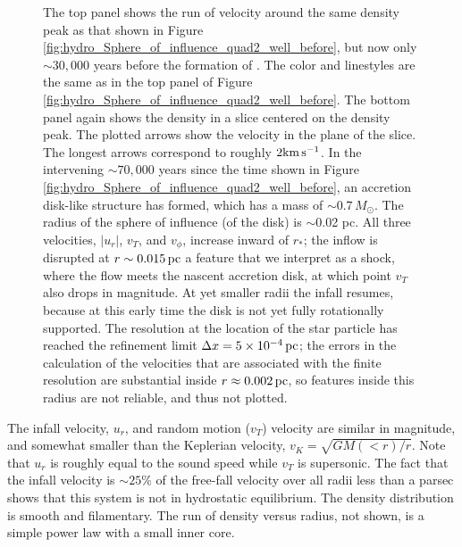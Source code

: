 \documentclass[../dissertation.tex]{subfiles}
\begin{document}
%
\begin{figure}[htb] %
\caption[Hydro Sphere of Influence 2]{\label{fig:hydro_Sphere_influence_quad2_prior_to_particle}The top panel shows the run of velocity around the same density peak 
as that shown in Figure \ref{fig:hydro_Sphere_of_influence_quad2_well_before}, 
but now only $\sim 30,000$ years before the formation of \partA .
The color and linestyles are the same as in the top panel of Figure \ref{fig:hydro_Sphere_of_influence_quad2_well_before}.
The bottom panel again shows the density in a slice centered on the density peak.
The plotted arrows show the velocity in the plane of the slice.
The longest arrows correspond to roughly $2 {\rm km \, s^{-1}}$.
In the intervening $\sim 70,000$ years since the time shown in Figure \ref{fig:hydro_Sphere_of_influence_quad2_well_before}, an accretion disk-like structure has formed, which has a 
mass of $\sim 0.7 \, M_\odot$.
The radius of the sphere of influence (of the disk) is $\sim$0.02 pc. All three velocities, 
$|u_r|$, $v_T$, and $v_\phi$, increase inward of $r_*$; the inflow is 
disrupted at $r \sim0.015\,\rm pc$ a feature that we interpret as a shock, where 
the flow meets the nascent 
accretion disk, at which point $v_T$ also drops in magnitude. 
At yet smaller radii the infall resumes, because at this early time the disk is not 
yet fully rotationally supported. The resolution at the location of the star 
particle has reached the refinement limit $\Delta x=5\times10^{-4}\,\rm pc$; the 
errors in the calculation of the velocities that are associated with the 
finite resolution are substantial inside $r\approx 0.002\,\rm pc$, so features 
inside this radius are not reliable, and thus not plotted.}

\end{figure}
%

The infall velocity, $u_r$, and random motion ($v_T$) %
 velocity are similar in magnitude, and 
somewhat smaller than the Keplerian velocity, $v_K = \sqrt{GM(<r) /r}$.
Note that $u_r$ is roughly equal to the sound speed while $v_T$ is supersonic.
The fact that the infall velocity is $\sim 25\%$ of the free-fall velocity 
over all radii less than a parsec shows that this system is not in hydrostatic equilibrium.
The density distribution is smooth and filamentary.
The run of density versus radius, not shown, is a simple power law with a small inner core.
\end{document}
